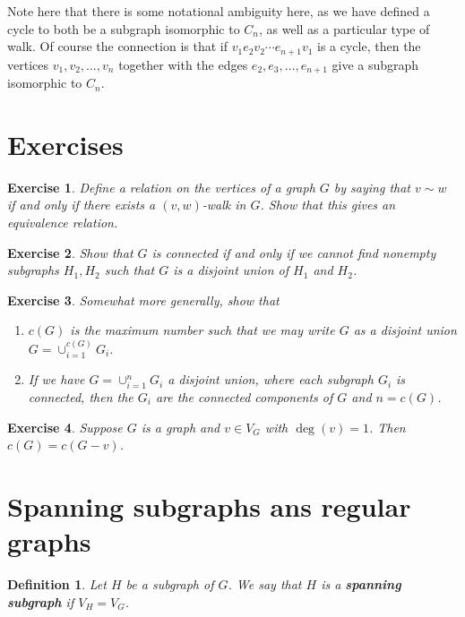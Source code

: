 \documentclass[12pt]{report}
\theoremstyle{plain}
\newtheorem{defn}[thm]{Definition}
\newtheorem{exercise}{Exercise}[section]
\newcommand{\Xb}[1]{\textbf{#1}\index{#1}}
\begin{document}
Note here that there is some notational ambiguity here, as we have defined
a cycle to both be a subgraph isomorphic to $C_n$, as well as a particular
type of walk. Of course the connection is that if $v_1 e_2 v_2 \cdots
e_{n+1} v_1$ is a cycle, then the vertices $v_1, v_2, \ldots, v_n$
together with the edges $e_2, e_3, \ldots, e_{n+1}$ give a subgraph isomorphic
to $C_n$.

\section{Exercises}

\begin{exercise} \label{walk equivalence}
Define a relation on the vertices of a graph $G$ by saying that $v \sim w$
if and only if there exists a $(v, w)$-walk in $G$. Show that this gives an
equivalence relation.
\end{exercise}

\begin{exercise}
Show that $G$ is connected if and only if we cannot find nonempty subgraphs
$H_1, H_2$ such that $G$ is a disjoint union of $H_1$ and $H_2$.
\end{exercise}

\begin{exercise} \label{components exercise}
Somewhat more generally, show that 
\begin{enumerate}[1. ]
\item $c(G)$ is the maximum number such that
we may write $G$ as a disjoint union $G = \cup_{i = 1}^{c(G)} G_i$.
\item If we have $G = \cup_{i = 1}^n G_i$ a disjoint union, where each
subgraph $G_i$ is connected, then the $G_i$ are the connected components of
$G$ and $n = c(G)$. 
\end{enumerate}
\end{exercise}

\begin{exercise} \label{leaf doesn't change components}
Suppose $G$ is a graph and $v \in V_G$ with $\deg(v) = 1$. Then $c(G) = c(G
- v)$.
\end{exercise}

\section{Spanning subgraphs ans regular graphs}

\begin{defn}
Let $H$ be a subgraph of $G$. We say that $H$ is a \Xb{spanning subgraph}
if $V_H = V_G$.
\end{defn}
\end{document}
